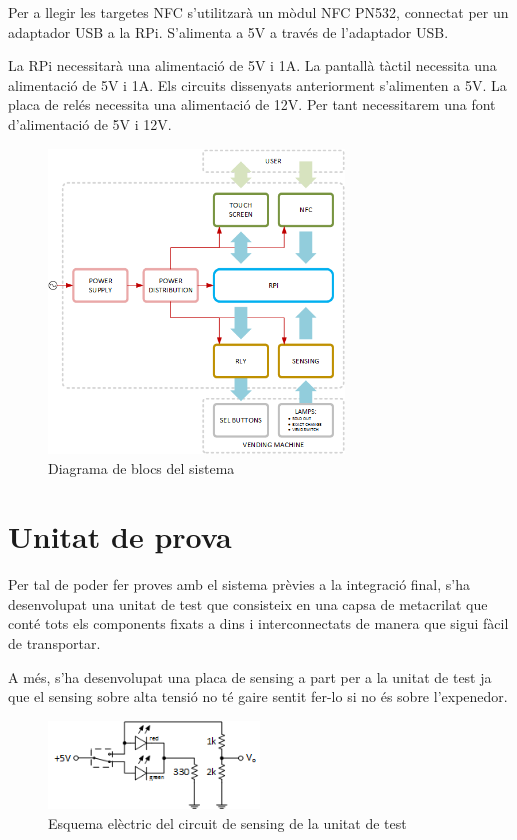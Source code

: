 Per a llegir les targetes NFC s'utilitzarà un mòdul NFC PN532, connectat per un adaptador USB a la RPi. S'alimenta a 5V a través de l'adaptador USB.

La RPi necessitarà una alimentació de 5V i 1A.
La pantallà tàctil necessita una alimentació de 5V i 1A.
Els circuits dissenyats anteriorment s'alimenten a 5V.
La placa de relés necessita una alimentació de 12V. Per tant necessitarem una font d'alimentació de 5V i 12V.

\begin{figure}[H]
\center
\includegraphics[width=0.7\textwidth]{images/block_diagram}
\caption{Diagrama de blocs del sistema}
\label{fig:block_diagram}
\end{figure}

\section{Unitat de prova}
Per tal de poder fer proves amb el sistema prèvies a la integració final, s'ha desenvolupat una unitat de test que consisteix en una capsa de metacrilat que conté tots els components fixats a dins i interconnectats de manera que sigui fàcil de transportar.

A més, s'ha desenvolupat una placa de sensing a part per a la unitat de test ja que el sensing sobre alta tensió no té gaire sentit fer-lo si no és sobre l'expenedor.

\begin{figure}[H]
\center
\includegraphics[width=0.5\textwidth]{images/sensing_demonstrator}
\caption{Esquema elèctric del circuit de sensing de la unitat de test}
\label{fig:sensing_demonstrator_board}
\end{figure}

